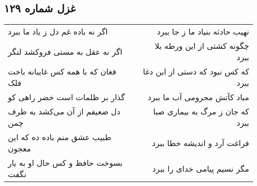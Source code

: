 \begin{center}
\section*{غزل شماره ۱۲۹}
\label{sec:sh129}
\begin{longtable}{l p{0.5cm} r}
اگر نه باده غم دل ز یاد ما ببرد
&&
نهیب حادثه بنیاد ما ز جا ببرد
\\
اگر نه عقل به مستی فروکشد لنگر
&&
چگونه کشتی از این ورطه بلا ببرد
\\
فغان که با همه کس غایبانه باخت فلک
&&
که کس نبود که دستی از این دغا ببرد
\\
گذار بر ظلمات است خضر راهی کو
&&
مباد کآتش محرومی آب ما ببرد
\\
دل ضعیفم از آن می‌کشد به طرف چمن
&&
که جان ز مرگ به بیماری صبا ببرد
\\
طبیب عشق منم باده ده که این معجون
&&
فراغت آرد و اندیشه خطا ببرد
\\
بسوخت حافظ و کس حال او به یار نگفت
&&
مگر نسیم پیامی خدای را ببرد
\\
\end{longtable}
\end{center}
